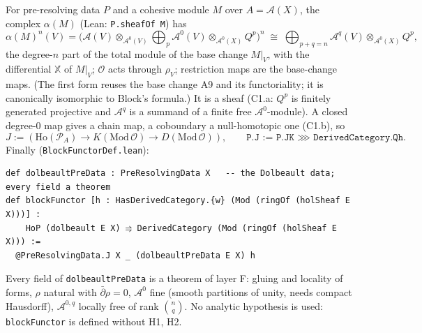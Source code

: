 For pre-resolving data $P$ and a cohesive module $M$ over $A={\mathcal{A}}(X)$, the complex
$\alpha(M)$ (Lean: \texttt{P.sheafOf M}) has
\[ \alpha(M)^n(V) = \bigl({\mathcal{A}}(V)\otimes_{{\mathcal{A}}^0(V)}\textstyle\bigoplus_p {\mathcal{A}}^0(V)\otimes_{{\mathcal{A}}^0(X)}Q^p\bigr)^n
\;\cong\; \textstyle\bigoplus_{p+q=n}{\mathcal{A}}^q(V)\otimes_{{\mathcal{A}}^0(X)}Q^p, \]
the degree-$n$ part of the total module of the base change $M|_V$, with the differential ${\mathbb{X}}$ of
$M|_V$; ${\mathcal{O}}$ acts through $\rho_V$; restriction maps are the base-change maps. (The first form
reuses the base change A9 and its functoriality; it is canonically isomorphic to Block's
formula.) It is a sheaf (C1.a: $Q^p$ is finitely generated projective and ${\mathcal{A}}^q$ is a summand of
a finite free ${\mathcal{A}}^0$-module). A closed degree-0 map gives a chain map, a coboundary a
null-homotopic one (C1.b), so
\[ J := ({\mathrm{Ho}}(\mathcal P_A)\to K(\mathrm{Mod}\,{\mathcal{O}})\to D(\mathrm{Mod}\,{\mathcal{O}})),\qquad
\texttt{P.J := P.JK ⋙ DerivedCategory.Qh}. \]
Finally (\texttt{BlockFunctorDef.lean}):
\begin{verbatim}
def dolbeaultPreData : PreResolvingData X   -- the Dolbeault data; every field a theorem
def blockFunctor [h : HasDerivedCategory.{w} (Mod (ringOf (holSheaf E X)))] :
    HoP (dolbeault E X) ⥤ DerivedCategory (Mod (ringOf (holSheaf E X))) :=
  @PreResolvingData.J X _ (dolbeaultPreData E X) h
\end{verbatim}
Every field of \texttt{dolbeaultPreData} is a theorem of layer F: gluing and locality of forms,
$\rho$ natural with ${\bar\partial}\rho=0$, ${\mathcal{A}}^0$ fine (smooth partitions of unity, needs compact
Hausdorff), ${\mathcal{A}}^{0,q}$ locally free of rank $\binom nq$. No analytic hypothesis is used:
\texttt{blockFunctor} is defined without H1, H2.

